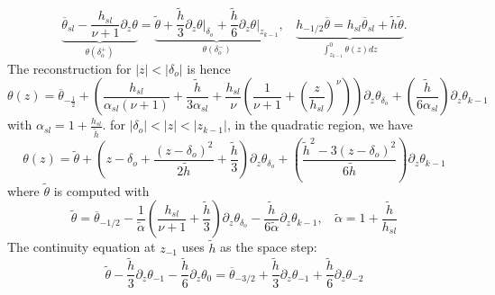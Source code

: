 \begin{equation}
\underbrace{
    \overline{\theta}_{sl} -
    \frac{h_{sl}}{\nu+1} \partial_z \theta
    }_{\theta(\delta_o^{+})}
    =
    \underbrace{
    \widetilde{\theta}
    + \frac{\widetilde{h}}{3}
    \left.\partial_z \theta\right|_{\delta_o}
    + \frac{\widetilde{h}}{6}
	\left.\partial_z \theta\right|_{z_{k-1}}}_{
	\theta(\delta_o^{-})}
	,
    ~~~~
	\underbrace{
    h_{-1/2} \overline{\theta} = 
    h_{sl}\overline{\theta}_{sl} +\widetilde{h}
    \widetilde{\theta}}_{
    \int_{z_{k-1}}^{0}\theta(z) dz
    }.
\end{equation}
The reconstruction for $|z|<|\delta_o|$ is hence
\begin{equation}
    \theta(z) =
    \overline{\theta}_{-\frac{1}{2}}
    +
    \left(\frac{h_{sl}}{\alpha_{sl}(\nu+1)} +
    \frac{\widetilde{h}}{3\alpha_{sl}}
    +
    \frac{h_{sl}}{\nu}\left(
    \frac{1}{\nu+1} + \left(\frac{z}{h_{sl}}
    \right)^\nu
    \right)\right) \partial_z \theta_{\delta_o}
    +
    \left(\frac{\widetilde{h}}{6\alpha_{sl}}\right)
    \partial_z \theta_{k-1}
\end{equation}
with $\alpha_{sl} = 1+\frac{h_{sl}}{\widetilde{h}}$.
for $|\delta_o| < |z| < |z_{k-1}|$,
in the quadratic region, we have
\begin{equation}
    \theta(z) =
        \widetilde{\theta}
        +
        \left(
        z-\delta_o + 
        \frac{(z-\delta_o)^2}{2\widetilde{h}}
        + \frac{\widetilde{h}}{3}
        \right)\partial_z \theta_{\delta_o}
        +
        \left(
        \frac{\widetilde{h}^2 - 
        3(z-\delta_o)^2}{6 \widetilde{h}}
        \right)\partial_z \theta_{k-1}
\end{equation}
where $\widetilde{\theta}$ is computed with
\begin{equation}
\label{eq:formulaTildeTheta}
\widetilde{\theta} = \overline{\theta}_{-1/2}
-\frac{1}{\widetilde{\alpha}}\left(
\frac{h_{sl}}{\nu+1} + \frac{\widetilde{h}}{3}
\right)\partial_z \theta_{\delta_o}
- \frac{\widetilde{h}}{6\widetilde{\alpha}}
\partial_z \theta_{k-1}, ~~~~ \widetilde{\alpha} = 1+ \frac{\widetilde{h}}{h_{sl}}
\end{equation}
The continuity equation at $z_{-1}$
uses $\widetilde{h}$
as the space step:
\begin{equation}
    \widetilde{\theta}
    - \frac{\widetilde{h}}{3}
    \partial_z \theta_{-1}
    - \frac{\widetilde{h}}{6}
    \partial_z \theta_{0}
    = \overline{\theta}_{-3/2}
    + \frac{\widetilde{h}}{3}
    \partial_z \theta_{-1}
    + \frac{\widetilde{h}}{6}
    \partial_z \theta_{-2}
\end{equation}

